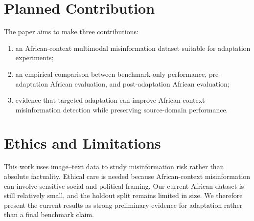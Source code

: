 \documentclass{article}
\begin{document}
\section{Planned Contribution}
The paper aims to make three contributions:
\begin{enumerate}
    \item an African-context multimodal misinformation dataset suitable for adaptation experiments;
    \item an empirical comparison between benchmark-only performance, pre-adaptation African evaluation, and post-adaptation African evaluation;
    \item evidence that targeted adaptation can improve African-context misinformation detection while preserving source-domain performance.
\end{enumerate}

\section{Ethics and Limitations}
This work uses image--text data to study misinformation risk rather than absolute factuality. Ethical care is needed because African-context misinformation can involve sensitive social and political framing. Our current African dataset is still relatively small, and the holdout split remains limited in size. We therefore present the current results as strong preliminary evidence for adaptation rather than a final benchmark claim.
\end{document}
